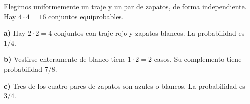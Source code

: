 Elegimos uniformemente un traje y un par de zapatos, de forma
independiente. Hay $4\cdot4=16$ conjuntos equiprobables.

\textbf{a)} Hay $2\cdot2=4$ conjuntos con traje rojo y zapatos
blancos. La probabilidad es $\boxed{1/4}$.

\textbf{b)} Vestirse enteramente de blanco tiene $1\cdot2=2$
casos. Su complemento tiene probabilidad $\boxed{7/8}$.

\textbf{c)} Tres de los cuatro pares de zapatos son azules o
blancos. La probabilidad es $\boxed{3/4}$.
